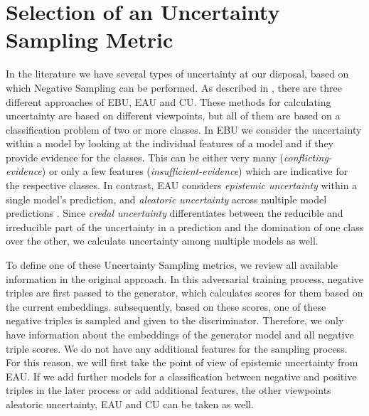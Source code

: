 \section{Selection of an Uncertainty Sampling Metric} 
\label{sec:selection_of_an_uncertainty_sampling_metric}

In the literature we have several types of uncertainty at our disposal, based on which Negative Sampling can be performed.
As described in , there are three different approaches of \ac{EBU}, \ac{EAU} and \ac{CU}.
These methods for calculating uncertainty are based on different viewpoints, but all of them are based on a classification problem of two or more classes.
In \ac{EBU} we consider the uncertainty within a model by looking at the individual features of a model and if they provide evidence for the classes.
This can be either very many (\textit{conflicting-evidence}) or only a few features (\textit{insufficient-evidence}) which are indicative for the respective classes.
In contrast, \ac{EAU} considers \textit{epistemic uncertainty} within a single model’s prediction, and \textit{aleatoric uncertainty} across multiple model predictions \cite{human-in-the-loop}.
Since \textit{credal uncertainty} differentiates between the reducible and irreducible part of the uncertainty in a prediction and the domination of one class over the other, we calculate uncertainty among multiple models as well.

To define one of these Uncertainty Sampling metrics, we review all available information in the original approach.
In this adversarial training process, negative triples are first passed to the generator, which calculates scores for them based on the current embeddings.
subsequently, based on these scores, one of these negative triples is sampled and given to the discriminator.
Therefore, we only have information about the embeddings of the generator model and all negative triple scores.
We do not have any additional features for the sampling process.
For this reason, we will first take the point of view of epistemic uncertainty from \ac{EAU}.
If we add further models for a classification between negative and positive triples in the later process or add additional features, the other viewpoints aleatoric uncertainty, \ac{EAU} and \ac{CU} can be taken as well.
